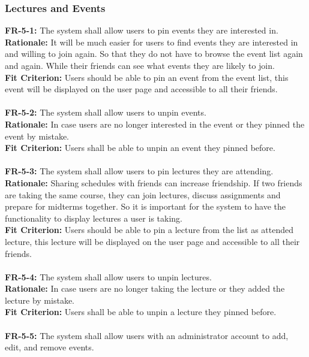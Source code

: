 \documentclass[12pt]{article}
\begin{document}
\subsubsection{Lectures and Events}
    \textbf{FR-5-1:} The system shall allow users to pin events they are interested in.\\
    \textbf{Rationale:} It will be much easier for users to find events they are interested in and willing to join again. So that they do not have to browse the event list again and again. While their friends can see what events they are likely to join.\\
    \textbf{Fit Criterion:} Users should be able to pin an event from the event list, this event will be displayed on the user page and accessible to all their friends.\\\\
    \textbf{FR-5-2:} The system shall allow users to unpin events.\\
    \textbf{Rationale:} In case users are no longer interested in the event or they pinned the event by mistake.\\
    \textbf{Fit Criterion:} Users shall be able to unpin an event they pinned before.\\\\
    \textbf{FR-5-3:} The system shall allow users to pin lectures they are attending.\\
    \textbf{Rationale:} Sharing schedules with friends can increase friendship. If two friends are taking the same course, they can join lectures, discuss assignments and prepare for midterms together. So it is important for the system to have the functionality to display lectures a user is taking.\\
    \textbf{Fit Criterion:} Users should be able to pin a lecture from the list as attended lecture, this lecture will be displayed on the user page and accessible to all their friends.\\\\
    \textbf{FR-5-4:} The system shall allow users to unpin lectures.\\
    \textbf{Rationale:} In case users are no longer taking the lecture or they added the lecture by mistake.\\
    \textbf{Fit Criterion:} Users shall be able to unpin a lecture they pinned before.\\\\
    \textbf{FR-5-5:} The system shall allow users with an administrator account to add, edit, and remove events.\\
\end{document}

